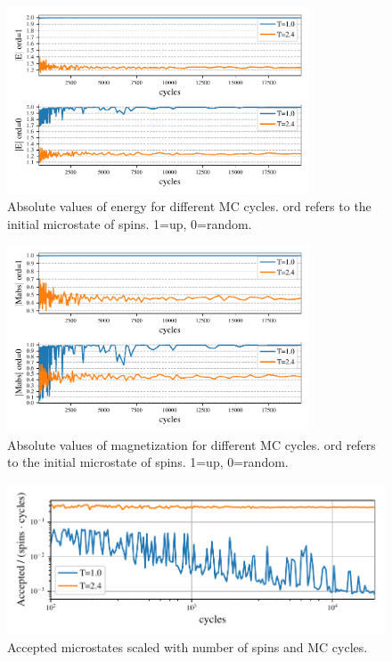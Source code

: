 \begin{figure}[H]
  \centering
  \includegraphics[width=0.8\textwidth]{../figures/equilibrium_E.pdf}
  \caption{Absolute values of energy for different MC cycles.
  ord refers to the initial microstate of spins. 1=up, 0=random.}
  \label{fig:equi_E}
\end{figure}


\begin{figure}[H]
  \centering
  \includegraphics[width=0.8\textwidth]{../figures/equilibrium_Mabs.pdf}
  \caption{Absolute values of magnetization for different MC cycles.
  ord refers to the initial microstate of spins. 1=up, 0=random.}
  \label{fig:equi_M}
\end{figure}




\begin{figure}[H]
  \centering
  \includegraphics[width=\textwidth]{../figures/accepted.pdf}
  \caption{Accepted microstates scaled with number of spins and MC cycles.}
  \label{fig:accepted}
\end{figure}

